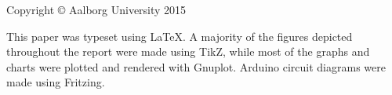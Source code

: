 \thispagestyle{empty}
{\small
\strut\vfill
\noindent Copyright \copyright{} Aalborg University 2015\par
\vspace{0.2cm}
\noindent This paper was typeset using \LaTeX. A majority of the figures depicted throughout the report were made using TikZ, while most of the graphs and charts were plotted and rendered with Gnuplot. Arduino circuit diagrams were made using Fritzing.}
\clearpage